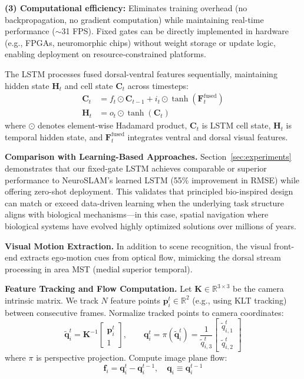 \textbf{(3) Computational efficiency:} Eliminates training overhead (no backpropagation, no gradient computation) while maintaining real-time per\-for\-mance ($\sim$31 FPS). Fixed gates can be directly implemented in hardware (e.g., FPGAs, neuromorphic chips) without weight storage or update logic, enabling deployment on resource-constrained platforms.

The LSTM processes fused dorsal-ventral features sequentially, maintaining hidden state $\mathbf{H}_t$ and cell state $\mathbf{C}_t$ across timesteps:
\begin{align}
    \mathbf{C}_t & = f_t \odot \mathbf{C}_{t-1} + i_t \odot \tanh(\mathbf{F}^{\text{fused}}_t) \\
    \mathbf{H}_t & = o_t \odot \tanh(\mathbf{C}_t)
\end{align}
where $\odot$ denotes element-wise Hadamard product, $\mathbf{C}_t$ is LSTM cell state, $\mathbf{H}_t$ is temporal hidden state, and $\mathbf{F}^{\text{fused}}_t$ integrates ventral and dorsal visual features.

\textbf{Comparison with Learning-Based Approaches.} Section~\ref{sec:experiments} demonstrates that our fixed-gate LSTM achieves comparable or superior per\-for\-mance to NeuroSLAM's learned LSTM (55\% improvement in RMSE) while offering zero-shot deployment. This validates that principled bio-inspired design can match or exceed data-driven learning when the underlying task structure aligns with biological mechanisms---in this case, spatial navigation where biological systems have evolved highly optimized solutions over millions of years.

\textbf{Visual Motion Extraction.} In addition to scene recognition, the visual front-end extracts ego-motion cues from optical flow, mimicking the dorsal stream processing in area MST (medial superior temporal).

\textbf{Feature Tracking and Flow Computation.} Let $\mathbf{K}\in\mathbb{R}^{3\times 3}$ be the camera intrinsic matrix. We track $N$ feature points $\mathbf{p}_i^t\in\mathbb{R}^2$ (e.g., using KLT tracking) between consecutive frames. Normalize tracked points to camera coordinates:
\begin{equation}
    \tilde{\mathbf{q}}_i^t = \mathbf{K}^{-1}\begin{bmatrix}\mathbf{p}_i^t\\ 1\end{bmatrix},\qquad \mathbf{q}_i^t = \pi(\tilde{\mathbf{q}}_i^t)=\frac{1}{\tilde{q}_{i,3}^t}\begin{bmatrix}\tilde{q}_{i,1}^t\\ \tilde{q}_{i,2}^t\end{bmatrix}
\end{equation}
where $\pi$ is perspective projection. Compute image plane flow:
\begin{equation}
    \mathbf{f}_i=\mathbf{q}_i^t-\mathbf{q}_i^{t-1},\quad \mathbf{q}_i\equiv\mathbf{q}_i^{t-1}
\end{equation}

